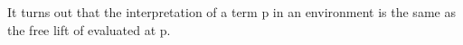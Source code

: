 \begin{code}
\AgdaSymbol{(}\AgdaSpace{}%
\AgdaOperator{\AgdaInductiveConstructor{,}}\AgdaSpace{}%
\AgdaSpace{}%
\AgdaSpace{}%
\AgdaSpace{}%
\AgdaSymbol{(}\AgdaSpace{}%
\AgdaSymbol{)\{}\AgdaSpace{}%
\AgdaSymbol{\}}\AgdaSpace{}%
\AgdaSymbol{))}\<%
\\
%
\\[\AgdaEmptyExtraSkip]%
%
\>[2]\AgdaSpace{}%
\AgdaSymbol{:}\AgdaSpace{}%
\AgdaSpace{}%
\AgdaSymbol{(}\AgdaSpace{}%
\AgdaSymbol{)}\AgdaSpace{}%
\AgdaSpace{}%
\<%
\\
%
\>[2]\AgdaSpace{}%
\AgdaSymbol{=}\AgdaSpace{}%
\AgdaSpace{}%
\AgdaSymbol{\}\{}\AgdaSymbol{\}}\AgdaSpace{}%
\AgdaSpace{}%
\AgdaSymbol{\{}\AgdaSymbol{\}\{}\AgdaSymbol{\})}\<%
\\
\>[0]\<%
\end{code}
\fi

It turns out that the interpretation of a term \ab p in an environment  is the same
as the free lift of  evaluated at \ab p.


